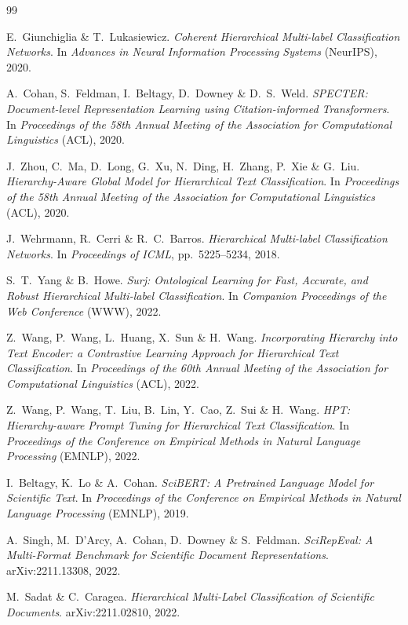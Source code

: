 \documentclass[11pt,a4paper,twoside]{article}
\begin{document}

\begin{thebibliography}{99}

E.~Giunchiglia \& T.~Lukasiewicz.
\textit{Coherent Hierarchical Multi-label Classification Networks}.
In \textit{Advances in Neural Information Processing Systems} (NeurIPS), 2020.

A.~Cohan, S.~Feldman, I.~Beltagy, D.~Downey \& D.~S.~Weld.
\textit{SPECTER: Document-level Representation Learning using Citation-informed
Transformers}.
In \textit{Proceedings of the 58th Annual Meeting of the Association for
Computational Linguistics} (ACL), 2020.

J.~Zhou, C.~Ma, D.~Long, G.~Xu, N.~Ding, H.~Zhang, P.~Xie \& G.~Liu.
\textit{Hierarchy-Aware Global Model for Hierarchical Text Classification}.
In \textit{Proceedings of the 58th Annual Meeting of the Association for
Computational Linguistics} (ACL), 2020.

J.~Wehrmann, R.~Cerri \& R.~C.~Barros.
\textit{Hierarchical Multi-label Classification Networks}.
In \textit{Proceedings of ICML}, pp.~5225--5234, 2018.

S.~T.~Yang \& B.~Howe.
\textit{Surj: Ontological Learning for Fast, Accurate, and Robust
Hierarchical Multi-label Classification}.
In \textit{Companion Proceedings of the Web Conference} (WWW), 2022.

Z.~Wang, P.~Wang, L.~Huang, X.~Sun \& H.~Wang.
\textit{Incorporating Hierarchy into Text Encoder: a Contrastive Learning
Approach for Hierarchical Text Classification}.
In \textit{Proceedings of the 60th Annual Meeting of the Association for
Computational Linguistics} (ACL), 2022.

Z.~Wang, P.~Wang, T.~Liu, B.~Lin, Y.~Cao, Z.~Sui \& H.~Wang.
\textit{HPT: Hierarchy-aware Prompt Tuning for Hierarchical Text Classification}.
In \textit{Proceedings of the Conference on Empirical Methods in Natural Language
Processing} (EMNLP), 2022.

I.~Beltagy, K.~Lo \& A.~Cohan.
\textit{SciBERT: A Pretrained Language Model for Scientific Text}.
In \textit{Proceedings of the Conference on Empirical Methods in Natural Language
Processing} (EMNLP), 2019.

A.~Singh, M.~D'Arcy, A.~Cohan, D.~Downey \& S.~Feldman.
\textit{SciRepEval: A Multi-Format Benchmark for Scientific Document Representations}.
arXiv:2211.13308, 2022.

M.~Sadat \& C.~Caragea.
\textit{Hierarchical Multi-Label Classification of Scientific Documents}.
arXiv:2211.02810, 2022.

\end{thebibliography}
\end{document}
